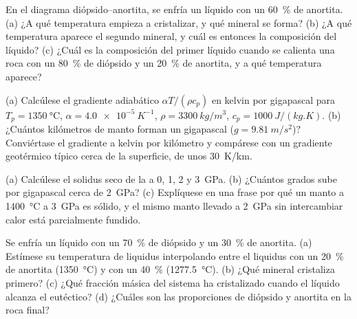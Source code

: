 \begin{exercise}[$\star$]\label{exo:b2:mantle-melting:2}
En el diagrama diópsido--anortita, se enfría un líquido con un \qty{60}{\percent} de anortita.
(a) ¿A qué temperatura empieza a cristalizar, y qué mineral
se forma? (b) ¿A qué temperatura aparece el segundo mineral, y cuál es entonces
la composición del líquido? (c) ¿Cuál es la composición del primer líquido cuando
se calienta una roca con un \qty{80}{\percent} de diópsido y un \qty{20}{\percent} de anortita,
y a qué temperatura aparece?
\end{exercise}

\begin{exercise}[$\star$]\label{exo:b2:mantle-melting:3}
(a) Calcúlese el gradiente adiabático $\alpha T/(\rho c_p)$ en kelvin por gigapascal
para $T_p = \qty{1350}{\celsius}$, $\alpha = \qty{4.0e-5}{K^{-1}}$, $\rho =
\qty{3300}{kg/m^3}$, $c_p = \qty{1000}{J/(kg.K)}$. (b) ¿Cuántos kilómetros de
manto forman un gigapascal ($g = \qty{9.81}{m/s^2}$)? Conviértase el gradiente a kelvin
por kilómetro y compárese con un gradiente geotérmico típico cerca de la superficie,
de unos \qty{30}{K/km}.
\end{exercise}

\begin{exercise}[$\star$]\label{exo:b2:mantle-melting:4}
(a) Calcúlese el solidus seco de la  a 0, 1, 2 y \qty{3}{GPa}. (b) ¿Cuántos
grados sube por gigapascal cerca de \qty{2}{GPa}? (c) Explíquese en una
frase por qué un manto a \qty{1400}{\celsius} a \qty{3}{GPa} es sólido, y el
mismo manto llevado a \qty{2}{GPa} sin intercambiar calor está parcialmente fundido.
\end{exercise}

\begin{exercise}[$\star\star$]\label{exo:b2:mantle-melting:5}
Se enfría un líquido con un \qty{70}{\percent} de diópsido y un \qty{30}{\percent} de anortita.
(a) Estímese su temperatura de liquidus interpolando entre el liquidus con un
\qty{20}{\percent} de anortita (\qty{1350}{\celsius}) y con un \qty{40}{\percent}
(\qty{1277.5}{\celsius}). (b) ¿Qué mineral cristaliza primero? (c) ¿Qué fracción
másica del sistema ha cristalizado cuando el líquido alcanza el eutéctico?
(d) ¿Cuáles son las proporciones de diópsido y anortita en la roca final?
\end{exercise}

